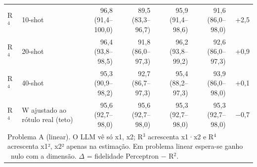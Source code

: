 \begin{table}[htbp]
\begin{tabular}{llrrrrr}
R$^4$ & 10-shot & 96,8 (91,4–100,0) & 89,5 (83,3–96,7) & 95,9 (91,4–98,6) & 91,6 (86,0–98,0) & +2,5 \\
R$^4$ & 20-shot & 96,4 (93,8–98,5) & 91,8 (86,0–97,3) & 96,2 (93,8–99,2) & 92,6 (86,0–97,3) & +0,9 \\
R$^4$ & 40-shot & 95,3 (90,9–98,2) & 92,7 (86,7–97,3) & 95,4 (88,2–97,3) & 93,9 (86,0–98,0) & +0,1 \\
R$^4$ & W ajustado ao rótulo real (teto) & 95,6 (92,7–98,0) & 95,6 (92,7–98,0) & 95,3 (92,7–98,0) & 95,3 (92,7–98,0) & $-$0,7 \\
\bottomrule
\multicolumn{7}{p{0.95\linewidth}}{\footnotesize Problema A (linear). O LLM vê só x1, x2; R$^3$ acrescenta x1·x2 e R$^4$ acrescenta x1², x2² apenas na estimação. Em problema linear espera-se ganho ~nulo com a dimensão. $\Delta$ = fidelidade Perceptron $-$ R$^2$.} \\
\end{tabular}
\end{table}
